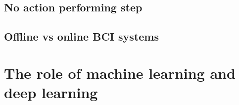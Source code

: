 
\subsection{No action performing step}
\label{subsec:processing_signals_alternative_pipelines_no_actions}


\lipsum[1-2]


\subsection{Offline vs online BCI systems}
\label{subsec:processing_signals_alternative_pipelines_offline_vs_online}

\lipsum[1-4]




\section{The role of machine learning and deep learning}
\label{sec:processing_signals_ml_and_dl}





